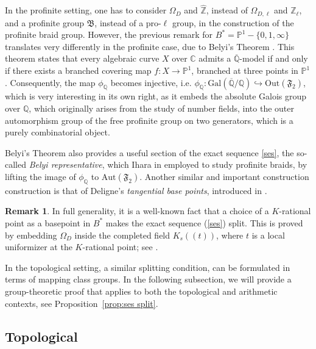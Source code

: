 \documentclass[10pt]{amsart}
\theoremstyle{definition}
\newtheorem{remark}[theorem]{Remark}
\newcommand{\Z}{\mathbb{Z}}
\newcommand{\Q}{\mathbb{Q}}
\newcommand{\A}{{ \mathrm{Aut} }}
\newcommand{\Gal}{{ \mathrm{Gal}}}
\newcommand{\Out}{{ \mathrm{Out}}}
\begin{document}
In the profinite setting, one has to consider $\Omega_D$ and $\hat{\Z}$, instead of $\Omega_{D,\ell}$ and $\Z_\ell$, and a profinite group $\mathfrak{B}$, instead of a pro-$\ell$ group, in the construction of the profinite braid group. However, the previous remark for $B^* = \mathbb{P}^1-\{0,1,\infty\}$ translates very differently in the profinite case, due to Belyi's Theorem \cite{Belyi1}. 
This theorem states that every algebraic curve $X$ over $\mathbb{C}$ admits a $\overline{\Q}$-model if and only if there exists a branched covering map $f\colon X\rightarrow \mathbb{P}^1$, branched at three points in $\mathbb{P}^1$. Consequently, the map $\phi_\Q $  becomes injective, i.e. $ \phi_\Q \colon  \Gal( \overline{\Q} / \Q) \hookrightarrow \Out (\mathfrak{F}_2) $, which is very interesting in its own right, as it embeds the absolute Galois group over $\mathbb{Q}$, which originally arises from the study of number fields, into the outer automorphism group of the free profinite group on two generators, which is a purely combinatorial object.

Belyi's Theorem also provides a useful section of the exact sequence \ref{ses}, the so-called {\em Belyi representative}, which Ihara in \cite{Ihara1985-it} employed to study profinite braids, by lifting the image of $\phi_\Q$ to $\A(\mathfrak{F}_2)$. Another similar and important construction construction is that of Deligne's {\em tangential base points}, introduced in \cite{Deligne89}. 
\begin{remark}{\label{rem:seqsplit}}
  In full generality, it is a well-known fact that a choice of a $K$-rational point as a basepoint in $B^*$ makes the exact sequence (\ref{ses}) split. This is proved by embedding $\Omega_D$ inside the completed field $K_s((t))$, where $t$ is a local uniformizer at the $K$-rational point; see \cite[p.220]{MR1352273}.
\end{remark}

In the topological setting, a similar splitting condition, can be formulated in terms of mapping class groups. In the following subsection, we will provide a group-theoretic proof that applies to both the topological and arithmetic contexts, see Proposition~\ref{prop:ses split}.

\subsection{Topological}
\label{sec:braids}
\end{document}
